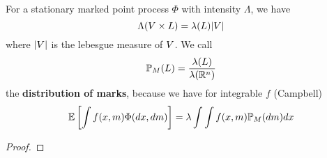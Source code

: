 \begin{lemma}[Campbell]\label{lem: Campbell}
	For a stationary marked point process \(\Phi\) with intensity \(\Lambda\),
	we have	
	\[
		\Lambda(V \times L) = \lambda(L) |V|
	\]
	where \(|V|\) is the lebesgue measure of \(V\). We call
	\[
		\mathbb{P}_M(L) = \frac{\lambda(L)}{\lambda(\mathbb{R}^n)}
	\]
	the \textbf{distribution of marks}, because we have for integrable \(f\)
	(Campbell)
	\[
		\mathbb{E}\left[\int f(x,m) \Phi(dx,dm)\right]
		= \lambda \int \int f(x,m) \mathbb{P}_M(dm) dx
	\]
\end{lemma}
\begin{proof}
\end{proof}
